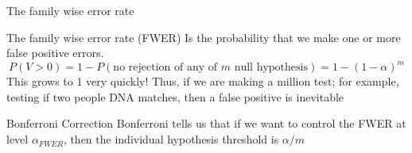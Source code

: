 \documentclass{bredelebeamer}
\begin{document}
\begin{frame}{The family wise error rate}
\begin{block}{The family wise error rate (FWER)}
Is the probability that we make one or more false positive errors.
\begin{equation}
P(V > 0 ) = 1 - P(\text{no rejection of any of } m \text{ null hypothesis}) = 1 - (1 - \alpha)^m
\end{equation}
This grows to 1 very quickly! Thus, if we are making a million test; for example, testing if two people DNA matches, then a false positive is inevitable
\end{block}
\begin{block}{Bonferroni Correction}
Bonferroni tells us that if we want to control the FWER at level $\alpha_{FWER}$, then the individual hypothesis threshold is $\alpha/m$
\end{block}
\end{frame}
\end{document}
